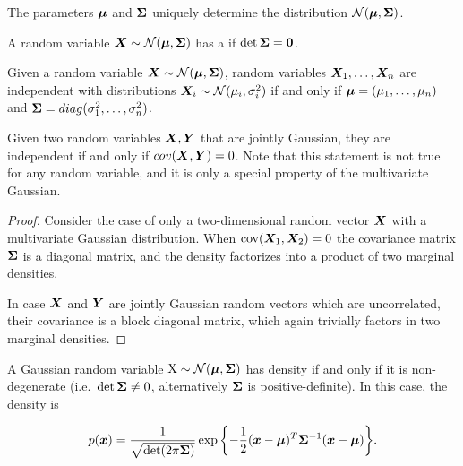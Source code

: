\begin{rem}
  The parameters ${\boldsymbol{\mu}}$ and ${\bm{\Sigma}}$ uniquely determine the distribution $\mathcal{N}({\boldsymbol{\mu}}, {\bm{\Sigma}})$.
\end{rem}

\begin{defn}
  A random variable ${\bm{X}} \sim \mathcal{N}({\boldsymbol{\mu}}, {\bm{\Sigma}})$ has a 
  if $\det {\bm{\Sigma}} = {\bm{0}}$.
\end{defn}

\begin{rem}
  Given a random variable ${\bm{X}} \sim \mathcal{N}({\boldsymbol{\mu}}, {\bm{\Sigma}})$, random variables ${\bm{X}}_1, \ldots,
  {\bm{X}}_n$ are independent with distributions ${\bm{X}}_i \sim \mathcal{N}(\mu_i, \sigma_i^2)$ if and only
  if ${\boldsymbol{\mu}} = (\mu_1, \ldots, \mu_n)$ and ${\bm{\Sigma}} = diag(\sigma_1^2, \ldots, \sigma_n^2)$.
\end{rem}

\begin{thm}
  Given two random variables ${\bm{X}}, {\bm{Y}}$ that are jointly Gaussian, they are independent if and only if $cov({\bm{X}}, {\bm{Y}}) = 0$. Note that
  this statement is not true for any random variable, and it is only a special property of the
  multivariate Gaussian.
\end{thm}

\begin{proof}
	Consider the case of only a two-dimensional random vector ${\bm{X}}$ with a multivariate Gaussian distribution. When $\operatorname{cov}({\bm{X}}_1, {\bm{X}}_2) = 0$ the covariance matrix ${\bm{\Sigma}}$ is a diagonal matrix, and the density factorizes into a product of two marginal densities.
	
	In case ${\bm{X}}$ and ${\bm{Y}}$ are jointly Gaussian random vectors which are uncorrelated, their covariance is a block diagonal matrix, which again trivially factors in two marginal densities.
\end{proof}

\begin{thm}
  A Gaussian random variable ${\textnormal{X}} \sim \mathcal{N}({\boldsymbol{\mu}}, {\bm{\Sigma}})$ has density if and only if
  it is non-degenerate (i.e.\ $\det {\bm{\Sigma}} \neq 0$, alternatively ${\bm{\Sigma}}$
  is positive-definite). In this case, the density is

  \begin{equation}
    \label{eq:mvn-definition}
    p({\boldsymbol{x}}) = \frac{1}{\sqrt{\det(2 \pi {\bm{\Sigma}})}} \exp{ \left\{ - \frac{1}{2}
    ({\boldsymbol{x}}- {\boldsymbol{\mu}})^T {\bm{\Sigma}}^{-1} ({\boldsymbol{x}}- {\boldsymbol{\mu}}) \right\} }.
  \end{equation}
\end{thm}

